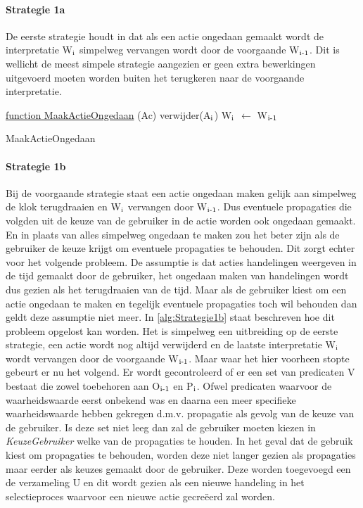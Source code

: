 \paragraph{Strategie 1a}
De eerste strategie houdt in dat als een actie ongedaan gemaakt wordt de interpretatie W$\textsubscript{i}$ simpelweg vervangen wordt door de voorgaande W$\textsubscript{i-1}$. Dit is wellicht de meest simpele strategie aangezien er geen extra bewerkingen uitgevoerd moeten worden buiten het terugkeren naar de voorgaande interpretatie.

\begin{algorithm}
	\underline{function MaakActieOngedaan} (Ac)\;
	\Output{}
	verwijder(A$\textsubscript{i}$)\;
	W$\textsubscript{i}$ $\leftarrow$ W$\textsubscript{i-1}$\;
	\caption{MaakActieOngedaan\label{alg:Strategie1a}}
\end{algorithm}

\paragraph{Strategie 1b}
Bij de voorgaande strategie staat een actie ongedaan maken gelijk aan simpelweg de klok terugdraaien en W$\textsubscript{i}$ vervangen door W$\textsubscript{i-1}$. Dus eventuele propagaties die volgden uit de keuze van de gebruiker in de actie worden ook ongedaan gemaakt. En in plaats van alles simpelweg ongedaan te maken zou het beter zijn als de gebruiker de keuze krijgt om eventuele propagaties te behouden. Dit zorgt echter voor het volgende probleem. De assumptie is dat acties handelingen weergeven in de tijd gemaakt door de gebruiker, het ongedaan maken van handelingen wordt dus gezien als het terugdraaien van de tijd. Maar als de gebruiker kiest om een actie ongedaan te maken en tegelijk eventuele propagaties toch wil behouden dan geldt deze assumptie niet meer. In \ref{alg:Strategie1b} staat beschreven hoe dit probleem opgelost kan worden. Het is simpelweg een uitbreiding op de eerste strategie, een actie wordt nog altijd verwijderd en de laatste interpretatie W$\textsubscript{i}$ wordt vervangen door de voorgaande W$\textsubscript{i-1}$. Maar waar het hier voorheen stopte gebeurt er nu het volgend. Er wordt gecontroleerd of er een set van predicaten V bestaat die zowel toebehoren aan O$\textsubscript{i-1}$ en P$\textsubscript{i}$. Ofwel predicaten waarvoor de waarheidswaarde eerst onbekend was en daarna een meer specifieke waarheidswaarde hebben gekregen d.m.v. propagatie als gevolg van de keuze van de gebruiker. Is deze set niet leeg dan zal de gebruiker moeten kiezen in \emph{KeuzeGebruiker} welke van de propagaties te houden. In het geval dat de gebruik kiest om propagaties te behouden, worden deze niet langer gezien als propagaties maar eerder als keuzes gemaakt door de gebruiker. Deze worden toegevoegd een de verzameling U en dit wordt gezien als een nieuwe handeling in het selectieproces waarvoor een nieuwe actie gecre\"{e}erd zal worden.

